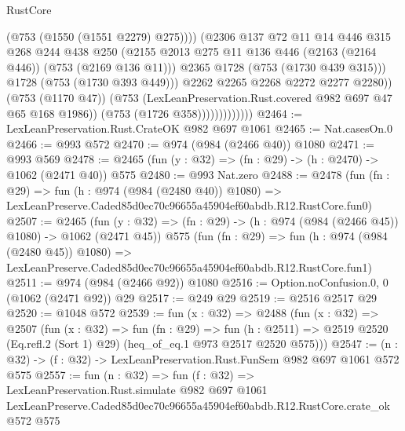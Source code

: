 \begin{lexlean}{RustCore}
\begin{coremodule}
                                    (@753 (@1550 (@1551 @2279) @275))))
                                (@2306
                                  @137
                                  @72
                                  @11
                                  @14
                                  @446
                                  @315
                                  @268
                                  @244
                                  @438
                                  @250
                                  (@2155
                                    @2013
                                    @275
                                    @11
                                    @136
                                    @446
                                    (@2163 (@2164 @446))
                                    (@753 (@2169 @136 @11)))
                                  @2365
                                  @1728
                                  (@753 (@1730 @439 @315)))
                                @1728
                                (@753 (@1730 @393 @449)))
                              @2262
                              @2265
                              @2268
                              @2272
                              @2277
                              @2280))
                          (@753 (@1170 @47))
                          (@753 (LexLeanPreservation.Rust.covered @982 @697 @47 @65 @168 @1986))
                          (@753 (@1726 @358)))))))))))))
@2464 := LexLeanPreservation.Rust.CrateOK @982 @697 @1061
@2465 := Nat.casesOn.{0}
@2466 := @993 @572
@2470 := @974 (@984 (@2466 @40)) @1080
@2471 := @993 @569
@2478 := @2465 (fun (y : @32) => (fn : @29) -> (h : @2470) -> @1062 (@2471 @40)) @575
@2480 := @993 Nat.zero
@2488 := @2478
    (fun (fn : @29) =>
    fun (h : @974 (@984 (@2480 @40)) @1080) =>
    LexLeanPreserve.Caded85d0ec70c96655a45904ef60abdb.R12.RustCore.fun0)
@2507 := @2465
    (fun (y : @32) => (fn : @29) -> (h : @974 (@984 (@2466 @45)) @1080) -> @1062 (@2471 @45))
    @575
    (fun (fn : @29) =>
    fun (h : @974 (@984 (@2480 @45)) @1080) =>
    LexLeanPreserve.Caded85d0ec70c96655a45904ef60abdb.R12.RustCore.fun1)
@2511 := @974 (@984 (@2466 @92)) @1080
@2516 := Option.noConfusion.{0, 0} (@1062 (@2471 @92)) @29
@2517 := @249 @29
@2519 := @2516 @2517 @29
@2520 := @1048 @572
@2539 := fun (x : @32) =>
  @2488
    (fun (x : @32) =>
    @2507
      (fun (x : @32) =>
      fun (fn : @29) =>
      fun (h : @2511) =>
      @2519 @2520 (Eq.refl.{2} (Sort 1) @29) (heq_of_eq.{1} @973 @2517 @2520 @575)))
@2547 := (n : @32) -> (f : @32) -> LexLeanPreservation.Rust.FunSem @982 @697 @1061 @572 @575
@2557 := fun (n : @32) =>
  fun (f : @32) =>
  LexLeanPreservation.Rust.simulate
    @982
    @697
    @1061
    LexLeanPreserve.Caded85d0ec70c96655a45904ef60abdb.R12.RustCore.crate_ok
    @572
    @575
\end{coremodule}
\end{lexlean}
